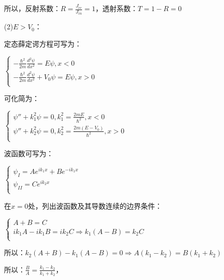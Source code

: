 所以，反射系数：$R = \frac{{J_{re} }}{{J_{in} }} = 1$，透射系数：$T = 1 - R = 0$

(2)$E > V_0 $：

定态薛定谔方程可写为：

\begin{center}
$\left\{ \begin{array}{l}
  - \frac{{\hbar ^2 }}{{2m}}\frac{{d^2 \psi }}{{dx^2 }} = E\psi ,x < 0 \\
  - \frac{{\hbar ^2 }}{{2m}}\frac{{d^2 \psi }}{{dx^2 }} + V_0 \psi  = E\psi ,x > 0 \\
 \end{array} \right.$
\end{center}

可化简为：

\begin{center}
$\left\{ \begin{array}{l}
 \psi '' + k_1 ^2 \psi  = 0,k_1 ^2  = \frac{{2mE}}{{\hbar ^2 }},x < 0 \\
 \psi '' + k_2 ^2 \psi  = 0,k_2 ^2  = \frac{{2m(E - V_0 )}}{{\hbar ^2 }},x > 0 \\
 \end{array} \right.$
\end{center}

波函数可写为：

\begin{center}
$\left\{ \begin{array}{l}
 \psi _I  = Ae^{ik_1 x}  + Be^{ - ik_1 x}  \\
 \psi _{II}  = Ce^{ik_2 x}  \\
 \end{array} \right.$
\end{center}

在$x=0$处，列出波函数及其导数连续的边界条件：

\begin{center}
$\left\{ \begin{array}{l}
 A + B = C \\
 ik_1 A - ik_1 B = ik_2 C \Rightarrow k_1 (A - B) = k{}_2C \\
 \end{array} \right.$
\end{center}

所以：$k_2 \left( {A + B} \right) - k_1 \left( {A - B} \right) = 0 \Rightarrow A\left( {k_1  - k_2 } \right) = B\left( {k_1  + k_2 } \right)$

所以：$\frac{B}{A} = \frac{{k_1  - k_2 }}{{k_1  + k_2 }}$，

